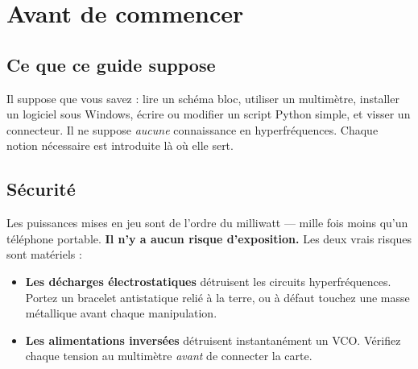 %

\section{Avant de commencer}

\subsection{Ce que ce guide suppose}

Il suppose que vous savez : lire un schéma bloc, utiliser un multimètre,
installer un logiciel sous Windows, écrire ou modifier un script Python simple,
et visser un connecteur. Il ne suppose \emph{aucune} connaissance en
hyperfréquences. Chaque notion nécessaire est introduite là où elle sert.

\subsection{Sécurité}

Les puissances mises en jeu sont de l'ordre du milliwatt --- mille fois moins
qu'un téléphone portable. \textbf{Il n'y a aucun risque d'exposition.} Les deux
vrais risques sont matériels :

\begin{itemize}[nosep]
\item \textbf{Les décharges électrostatiques} détruisent les circuits
      hyperfréquences. Portez un bracelet antistatique relié à la terre, ou à
      défaut touchez une masse métallique avant chaque manipulation.
\item \textbf{Les alimentations inversées} détruisent instantanément un VCO.
      Vérifiez chaque tension au multimètre \emph{avant} de connecter la carte.
\end{itemize}

